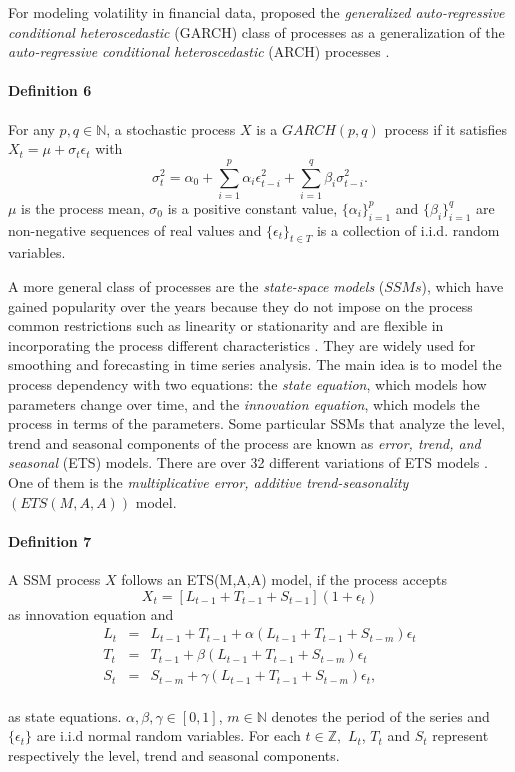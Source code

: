 For modeling volatility in financial data, \citet{Bollerslev1986} proposed the \emph{generalized auto-regressive conditional heteroscedastic} (GARCH) class of processes as a generalization of the \emph{auto-regressive conditional heteroscedastic} (ARCH) processes \citep{engle1982}.

\paragraph{Definition 6}\label{definition-6}

For any \(p,q \in \mathbb{N}\), a stochastic process \(X\) is a \(GARCH(p,q)\) process if it satisfies \(X_t = \mu + \sigma_{t}\epsilon_t\) with
\[
\sigma_t^2 = \alpha_0 +\sum_{i=1}^p\alpha_i \epsilon_{t-i}^2 +\sum_{i=1}^q \beta_{i}\sigma^2_{t-i}.
\]
\(\mu\) is the process mean, \(\sigma_0\) is a positive constant value, \(\{\alpha_i\}_{i=1}^p\) and \(\{\beta_i\}_{i=1}^q\) are non-negative sequences of real values and \(\{\epsilon_{t}\}_{t \in T}\) is a collection of i.i.d. random variables.

A more general class of processes are the \emph{state-space models} (\(SSMs\)), which have gained popularity over the years because they do not impose on the process common restrictions such as linearity or stationarity and are flexible in incorporating the process different characteristics \citep{OBrien2010}. They are widely used for smoothing \citep{west2006} and forecasting \citep{Rob2007} in time series analysis. The main idea is to model the process dependency with two equations: the \emph{state equation}, which models how parameters change over time, and the \emph{innovation equation}, which models the process in terms of the parameters. Some particular SSMs that analyze the level, trend and seasonal components of the process are known as \emph{error, trend, and seasonal} (ETS) models. There are over 32 different variations of ETS models \citep{Hyndman2008}. One of them is the \emph{multiplicative error, additive trend-seasonality} \((ETS(M,A,A))\) model.

\paragraph{Definition 7}\label{definition-7}

A SSM process \(X\) follows an ETS(M,A,A) model, if the process accepts\\
\[
X_t = [L_{t-1} +T_{t-1} + S_{t-1}](1 + \epsilon_t)
\]
as innovation equation and
\begin{eqnarray*}L_t &= &L_{t-1} +T_{t-1} +\alpha (L_{t-1} +T_{t-1} +S_{t-m})\epsilon_t\\
    T_t &= &T_{t-1} + \beta (L_{t-1} +T_{t-1} +S_{t-m})\epsilon_t\\
    S_t &= &S_{t-m} + \gamma (L_{t-1} +T_{t-1} +S_{t-m})\epsilon_t,
\end{eqnarray*}\\
as state equations.
\(\alpha, \beta,\gamma \in [0,1]\), \(m\in\mathbb{N}\) denotes the period of the series and \(\{\epsilon_t\}\) are i.i.d normal random variables. For each \(t\in\mathbb{Z},\) \(L_t\), \(T_t\) and \(S_t\) represent respectively the level, trend and seasonal components.

